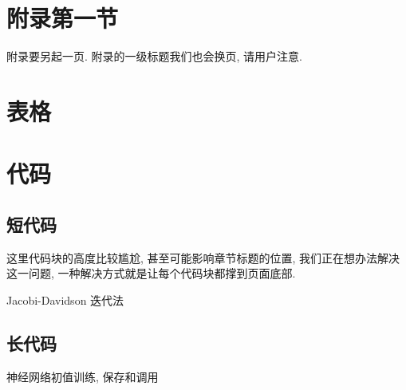 
\section{附录第一节}

附录要另起一页. 附录的一级标题我们也会换页, 请用户注意.

\zhlipsum

\section{表格}


\section{代码}

\subsection{短代码}

这里代码块的高度比较尴尬, 甚至可能影响章节标题的位置, 我们正在想办法解决这一问题, 一种解决方式就是让每个代码块都撑到页面底部.

\begin{listing}
  \caption{Jacobi-Davidson 迭代法}\label{code:JD-iter}
\end{listing}

\subsection{长代码}

\begin{longlisting}
	\caption{神经网络初值训练, 保存和调用}\label{code:NN-init}
\end{longlisting}
